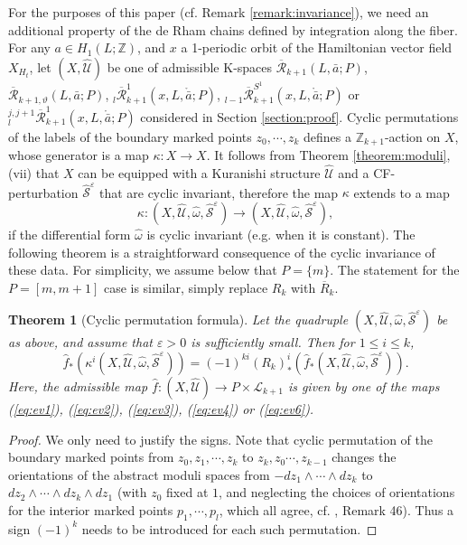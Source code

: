 \documentclass[a4paper]{article}
\newtheorem{theorem}{Theorem}
\numberwithin{equation}{section}
\begin{document}
For the purposes of this paper (cf. Remark \ref{remark:invariance}), we need an additional property of the de Rham chains defined by integration along the fiber. For any $a\in H_1(L;\mathbb{Z})$, and $x$ a 1-periodic orbit of the Hamiltonian vector field $X_{H_t}$, let $(X,\widehat{\mathcal{U}})$ be one of admissible K-spaces $\overline{\mathcal{R}}_{k+1}(L,\bar{a};P)$, $\overline{\mathcal{R}}_{k+1,\vartheta}(L,\bar{a};P)$, ${}_l\overline{\mathcal{R}}_{k+1}^1(x,L,\ring{\bar{a}};P)$, ${}_{l-1}\overline{\mathcal{R}}_{k+1}^{S^1}(x,L,\ring{\bar{a}};P)$ or ${}_l^{j,j+1}\overline{\mathcal{R}}_{k+1}^1(x,L,\ring{\bar{a}};P)$ considered in Section \ref{section:proof}. Cyclic permutations of the labels of the boundary marked points $z_0,\cdots,z_k$ defines a $\mathbb{Z}_{k+1}$-action on $X$, whose generator is a map $\kappa:X\rightarrow X$. It follows from Theorem \ref{theorem:moduli}, (vii) that $X$ can be equipped with a Kuranishi structure $\widehat{\mathcal{U}}$ and a CF-perturbation $\widehat{\mathcal{S}}^\varepsilon$ that are cyclic invariant, therefore the map $\kappa$ extends to a map
\begin{equation}
\kappa:(X,\widehat{\mathcal{U}},\hat{\omega},\widehat{\mathcal{S}}^\varepsilon)\rightarrow(X,\widehat{\mathcal{U}},\hat{\omega},\widehat{\mathcal{S}}^\varepsilon),
\end{equation}
if the differential form $\hat{\omega}$ is cyclic invariant (e.g. when it is constant). The following theorem is a straightforward consequence of the cyclic invariance of these data. For simplicity, we assume below that $P=\{m\}$. The statement for the $P=[m,m+1]$ case is similar, simply replace $R_k$ with $\overline{R}_k$.

\begin{theorem}[Cyclic permutation formula]\label{theorem:cyclic}
Let the quadruple $(X,\widehat{\mathcal{U}},\hat{\omega},\widehat{\mathcal{S}}^\varepsilon)$ be as above, and assume that $\varepsilon>0$ is sufficiently small. Then for $1\leq i\leq k$,
\begin{equation}
\hat{f}_\ast\left(\kappa^i(X,\widehat{\mathcal{U}},\hat{\omega},\widehat{\mathcal{S}}^\varepsilon)\right)=(-1)^{ki}(R_k)^i_\ast\left(\hat{f}_\ast(X,\widehat{\mathcal{U}},\hat{\omega},\widehat{\mathcal{S}}^\varepsilon)\right).
\end{equation}
Here, the admissible map $\hat{f}:(X,\widehat{\mathcal{U}})\rightarrow P\times\mathcal{L}_{k+1}$ is given by one of the maps (\ref{eq:ev1}), (\ref{eq:ev2}), (\ref{eq:ev3}), (\ref{eq:ev4}) or (\ref{eq:ev6}).
\end{theorem}
\begin{proof}
We only need to justify the signs. Note that cyclic permutation of the boundary marked points from $z_0,z_1,\cdots,z_k$ to $z_k,z_0\cdots,z_{k-1}$ changes the orientations of the abstract moduli spaces from $-dz_1\wedge\cdots\wedge dz_k$ to $dz_2\wedge\cdots\wedge dz_k\wedge dz_1$ (with $z_0$ fixed at $1$, and neglecting the choices of orientations for the interior marked points $p_1,\cdots,p_l$, which all agree, cf. \cite{sg1}, Remark 46). Thus a sign $(-1)^k$ needs to be introduced for each such permutation.
\end{proof}
\end{document}
